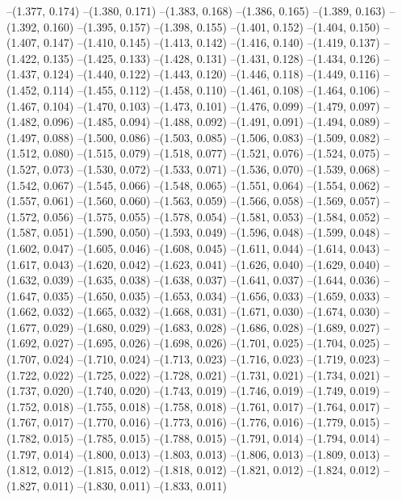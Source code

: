 --(1.377, 0.174)
--(1.380, 0.171)
--(1.383, 0.168)
--(1.386, 0.165)
--(1.389, 0.163)
--(1.392, 0.160)
--(1.395, 0.157)
--(1.398, 0.155)
--(1.401, 0.152)
--(1.404, 0.150)
--(1.407, 0.147)
--(1.410, 0.145)
--(1.413, 0.142)
--(1.416, 0.140)
--(1.419, 0.137)
--(1.422, 0.135)
--(1.425, 0.133)
--(1.428, 0.131)
--(1.431, 0.128)
--(1.434, 0.126)
--(1.437, 0.124)
--(1.440, 0.122)
--(1.443, 0.120)
--(1.446, 0.118)
--(1.449, 0.116)
--(1.452, 0.114)
--(1.455, 0.112)
--(1.458, 0.110)
--(1.461, 0.108)
--(1.464, 0.106)
--(1.467, 0.104)
--(1.470, 0.103)
--(1.473, 0.101)
--(1.476, 0.099)
--(1.479, 0.097)
--(1.482, 0.096)
--(1.485, 0.094)
--(1.488, 0.092)
--(1.491, 0.091)
--(1.494, 0.089)
--(1.497, 0.088)
--(1.500, 0.086)
--(1.503, 0.085)
--(1.506, 0.083)
--(1.509, 0.082)
--(1.512, 0.080)
--(1.515, 0.079)
--(1.518, 0.077)
--(1.521, 0.076)
--(1.524, 0.075)
--(1.527, 0.073)
--(1.530, 0.072)
--(1.533, 0.071)
--(1.536, 0.070)
--(1.539, 0.068)
--(1.542, 0.067)
--(1.545, 0.066)
--(1.548, 0.065)
--(1.551, 0.064)
--(1.554, 0.062)
--(1.557, 0.061)
--(1.560, 0.060)
--(1.563, 0.059)
--(1.566, 0.058)
--(1.569, 0.057)
--(1.572, 0.056)
--(1.575, 0.055)
--(1.578, 0.054)
--(1.581, 0.053)
--(1.584, 0.052)
--(1.587, 0.051)
--(1.590, 0.050)
--(1.593, 0.049)
--(1.596, 0.048)
--(1.599, 0.048)
--(1.602, 0.047)
--(1.605, 0.046)
--(1.608, 0.045)
--(1.611, 0.044)
--(1.614, 0.043)
--(1.617, 0.043)
--(1.620, 0.042)
--(1.623, 0.041)
--(1.626, 0.040)
--(1.629, 0.040)
--(1.632, 0.039)
--(1.635, 0.038)
--(1.638, 0.037)
--(1.641, 0.037)
--(1.644, 0.036)
--(1.647, 0.035)
--(1.650, 0.035)
--(1.653, 0.034)
--(1.656, 0.033)
--(1.659, 0.033)
--(1.662, 0.032)
--(1.665, 0.032)
--(1.668, 0.031)
--(1.671, 0.030)
--(1.674, 0.030)
--(1.677, 0.029)
--(1.680, 0.029)
--(1.683, 0.028)
--(1.686, 0.028)
--(1.689, 0.027)
--(1.692, 0.027)
--(1.695, 0.026)
--(1.698, 0.026)
--(1.701, 0.025)
--(1.704, 0.025)
--(1.707, 0.024)
--(1.710, 0.024)
--(1.713, 0.023)
--(1.716, 0.023)
--(1.719, 0.023)
--(1.722, 0.022)
--(1.725, 0.022)
--(1.728, 0.021)
--(1.731, 0.021)
--(1.734, 0.021)
--(1.737, 0.020)
--(1.740, 0.020)
--(1.743, 0.019)
--(1.746, 0.019)
--(1.749, 0.019)
--(1.752, 0.018)
--(1.755, 0.018)
--(1.758, 0.018)
--(1.761, 0.017)
--(1.764, 0.017)
--(1.767, 0.017)
--(1.770, 0.016)
--(1.773, 0.016)
--(1.776, 0.016)
--(1.779, 0.015)
--(1.782, 0.015)
--(1.785, 0.015)
--(1.788, 0.015)
--(1.791, 0.014)
--(1.794, 0.014)
--(1.797, 0.014)
--(1.800, 0.013)
--(1.803, 0.013)
--(1.806, 0.013)
--(1.809, 0.013)
--(1.812, 0.012)
--(1.815, 0.012)
--(1.818, 0.012)
--(1.821, 0.012)
--(1.824, 0.012)
--(1.827, 0.011)
--(1.830, 0.011)
--(1.833, 0.011)
